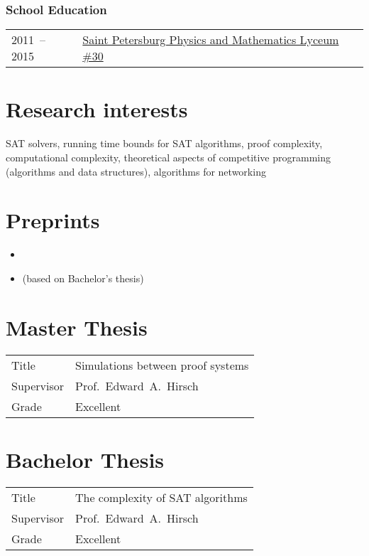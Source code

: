 \documentclass[a4paper, 11pt]{article}
\begin{document}
\subsubsection*{School Education}

\begin{tabularx}{\textwidth}{lX}
	2011~-- 2015 & \href{http://www.school30.spb.ru/}{Saint Petersburg Physics and Mathematics Lyceum \#30}
\end{tabularx}


\section*{Research interests}

SAT solvers, running time bounds for SAT algorithms, proof complexity, computational complexity, theoretical aspects of competitive programming (algorithms and data structures), algorithms for networking

\section*{Preprints}

\begin{itemize}
	\item {}
	\item {} (based on Bachelor's thesis)
\end{itemize}

\section*{Master Thesis}

\begin{tabularx}{\textwidth}{lX}
	Title & Simulations between proof systems \\
	Supervisor & Prof.~Edward~A.~Hirsch \\
	Grade & Excellent
\end{tabularx}

\section*{Bachelor Thesis}

\begin{tabularx}{\textwidth}{lX}
	Title & The complexity of SAT algorithms \\
	Supervisor & Prof.~Edward~A.~Hirsch \\
	Grade & Excellent
\end{tabularx}
\end{document}
